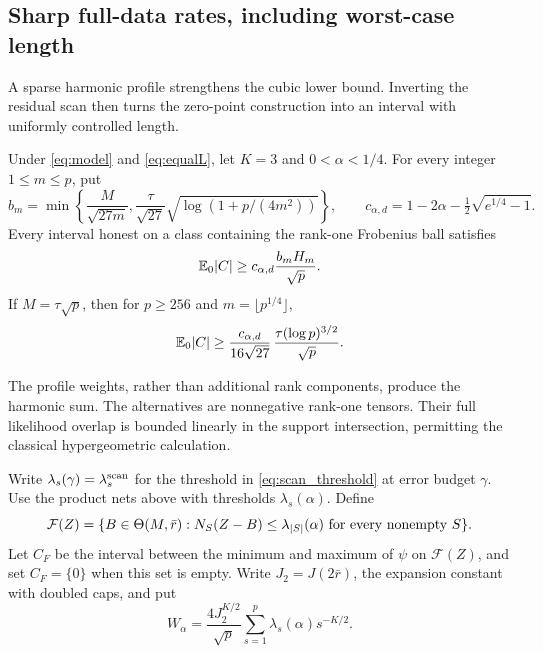 
\subsection{Sharp full-data rates, including worst-case length}\label{sec:sharp_full}

A sparse harmonic profile strengthens the cubic lower bound. Inverting the residual scan then turns the zero-point construction into an interval with uniformly controlled length.

\begin{theorem}\label{thm:sparse_harmonic}
Under \eqref{eq:model} and \eqref{eq:equalL}, let $K=3$ and $0<\alpha<1/4$.
For every integer $1\le m\le p$, put
\[
 b_m=\min\left\{\frac{M}{\sqrt{27m}},
       \frac{\tau}{\sqrt{27}}\sqrt{\log(1+p/(4m^2))}\right\},
 \qquad c_{\alpha,d}=1-2\alpha-\tfrac12\sqrt{e^{1/4}-1}.
\]
Every interval honest on a class containing the rank-one Frobenius ball satisfies
\begin{equation}\label{eq:sparse_harmonic}
 \mathbb E_0|C|\ge c_{\alpha,d}\frac{b_mH_m}{\sqrt p}.
\end{equation}
If $M=\tau\sqrt p$, then for $p\ge256$ and $m=\lfloor p^{1/4}\rfloor$,
\[
 \mathbb E_0|C|\ge\frac{c_{\alpha,d}}{16\sqrt{27}}\,
                  \frac{\tau(\log p)^{3/2}}{\sqrt p}.
\]
\end{theorem}

The profile weights, rather than additional rank components, produce the harmonic sum. The alternatives are nonnegative rank-one tensors. Their full likelihood overlap is bounded linearly in the support intersection, permitting the classical hypergeometric calculation.

Write $\lambda_s(\gamma)=\lambda_s^{\rm scan}$ for the threshold in
\eqref{eq:scan_threshold} at error budget $\gamma$.
Use the product nets above with thresholds $\lambda_s(\alpha)$. Define
\[
 {\cal F}(Z)=\{B\in\Theta(M,\bar r):
        N_S(Z-B)\le\lambda_{|S|}(\alpha)\text{ for every nonempty }S\}.
\]
Let $C_F$ be the interval between the minimum and maximum of $\psi$ on
$\mathcal F(Z)$, and set $C_F=\{0\}$ when this set is empty.
Write $J_2=J(2\bar r)$, the expansion constant with doubled caps, and put
\[
 W_\alpha=\frac{4J_2^{K/2}}{\sqrt p}
           \sum_{s=1}^p\lambda_s(\alpha)s^{-K/2}.
\]


